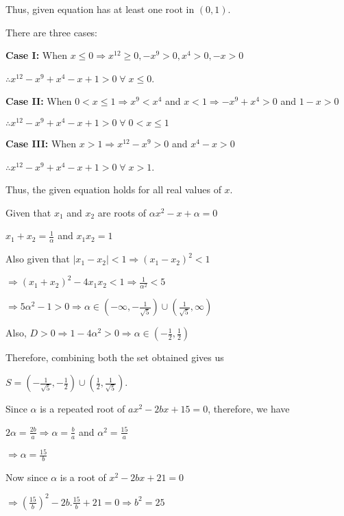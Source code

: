   Thus, given equation has at least one root in $(0, 1)$.
\item There are three cases:

  {\bf Case I:} When $x\leq 0\Rightarrow x^{12}\geq 0, -x^{9} > 0, x^4 > 0, -x > 0$

  $\therefore x^{12} - x^{9} + x^4 - x + 1 > 0\;\forall\;x\leq 0$.

  {\bf Case II:} When $0 <x \leq 1\Rightarrow x^9 < x^4$ and $x < 1\Rightarrow -x^9 + x^4 > 0$ and $1 - x >
  0$

  $\therefore x^{12} - x^{9} + x^4 - x + 1 > 0\;\forall\;0< x\leq 1$

  {\bf Case III:} When $x > 1\Rightarrow x^{12} - x^9 > 0$ and $x^4 - x > 0$

  $\therefore x^{12} - x^{9} + x^4 - x + 1 > 0\;\forall\;x > 1$.

  Thus, the given equation holds for all real values of $x$.
\item Given that $x_1$ and $x_2$ are roots of $\alpha x^2 - x + \alpha = 0$

  $x_1 + x_2 = \frac{1}{\alpha}$ and $x_1x_2 = 1$

  Also given that $\left|x_1 - x_2\right| < 1\Rightarrow \left(x_1 - x_2\right)^2 < 1$

  $\Rightarrow \left(x_1 + x_2\right)^2 - 4x_1x_2 < 1\Rightarrow \frac{1}{\alpha^2} < 5$

  $\Rightarrow 5\alpha^2 - 1 > 0\Rightarrow \alpha\in\left(-\infty,
  -\frac{1}{\sqrt{5}}\right)\cup \left(\frac{1}{\sqrt{5}}, \infty\right)$

  Also, $D > 0\Rightarrow 1 - 4\alpha^2 > 0 \Rightarrow \alpha\in\left(-\frac{1}{2}, \frac{1}{2}\right)$

  Therefore, combining both the set obtained gives us

  $S = \left(-\frac{1}{\sqrt{5}}, -\frac{1}{2}\right)\cup\left(\frac{1}{2}, \frac{1}{\sqrt{5}}\right)$.
\item Since $\alpha$ is a repeated root of $ax^2 - 2bx + 15 = 0$, therefore, we have

  $2\alpha = \frac{2b}{a}\Rightarrow \alpha = \frac{b}{a}$ and $\alpha^2 = \frac{15}{a}$

  $\Rightarrow \alpha = \frac{15}{b}$

  Now since $\alpha$ is a root of $x^2 - 2bx + 21 = 0$

  $\Rightarrow \left(\frac{15}{b}\right)^2 - 2b.\frac{15}{b} + 21 = 0 \Rightarrow b^2 = 25$

